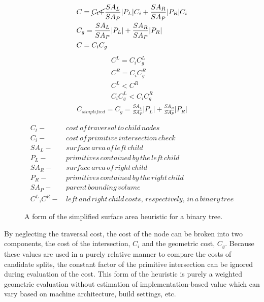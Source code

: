 \begin{figure}[H]
  \begin{align}
&C =  \cancel{C_{t} +} \frac{SA_{L}}{SA_{P}} |P_{L}|C_{i} + \frac{SA_{R}}{SA_{P}} |P_{R}|C_{i} \\
&C_{g} = \frac{SA_{L}}{SA_{P}} |P_{L}| +  \frac{SA_{R}}{SA_{P}}|P_{R}| \\
&C = C_{i}C_{g}
  \end{align}
  \begin{align*}
    C^{L} = C_{i} C^{L}_{g} \\
    C^{R} = C_{i} C^{R}_{g} \\
    C^{L} < C^{R} \\
    C_{i}C^{L}_{g} < C_{i}C^{R}_{g}
  \end{align*}
  \begin{align}
    C_{simplified} = C_{g} = \frac{SA_{L}}{SA_{P}} |P_{L}| +
    \frac{SA_{R}}{SA_{P}}|P_{R}|
    \label{eq:simplified_sah}
  \end{align}

  \begin{align*}
    C_{t} - & \,cost\, of\, traversal\, to\, child\, nodes \\
    C_{i} - & \, cost\, of\, primitive\, intersection\, check\, \\
    SA_{L} - &  \,surface\, area\, of\, left\, child \\
    P_{L} - & \, primitives\, contained\, by\, the\, left\, child  \\
    SA_{R} - & \, surface\, area\, of\, right\, child \\
    P_{R} - & \, primitives\, contained\, by\, the\, right\, child \\
    SA_{P} - & \, parent\, bounding\, volume \\
    C^{L} \text{,} C^{R} - & \, left \, and \, right \, child \, costs, \, respectively, \, in \, a \, binary \, tree
  \end{align*}
  
  \caption[Definition of the simplified surface area heuristic.]{A form of the
    simplified surface area heuristic for a binary tree.}
  \label{fig:SSAH}
\end{figure}

By neglecting the traversal cost, the cost of the node can be broken into two
components, the cost of the intersection, $C_{i}$ and the geometric cost,
$C_{g}$. Because these values are used in a purely relative manner to compare
the costs of candidate splits, the constant factor of the primitive intersection
can be ignored during evaluation of the cost. This form of the heuristic is
purely a weighted geometric evaluation without estimation of
implementation-based value which can vary based on machine architecture, build
settings, etc.

